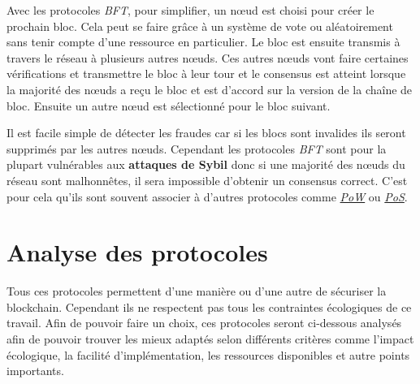 Avec les protocoles \emph{BFT}, pour simplifier, un nœud est choisi pour créer le prochain bloc. Cela peut se faire grâce à un système de vote ou aléatoirement sans tenir compte d'une ressource en particulier. Le bloc est ensuite transmis à travers le réseau à plusieurs autres nœuds. Ces autres nœuds vont faire certaines vérifications et transmettre le bloc à leur tour et le consensus est atteint lorsque la majorité des nœuds a reçu le bloc et est d'accord sur la version de la chaîne de bloc. Ensuite un autre nœud est sélectionné pour le bloc suivant.

Il est facile simple de détecter les fraudes car si les blocs sont invalides ils seront supprimés par les autres nœuds. Cependant les protocoles \emph{BFT} sont pour la plupart vulnérables aux \textbf{attaques de Sybil} donc si une majorité des nœuds du réseau sont malhonnêtes, il sera impossible d'obtenir un consensus correct. C'est pour cela qu'ils sont souvent associer à d'autres protocoles comme \hyperref[consensus:pow]{\emph{PoW}} ou \hyperref[consensus:pos]{\textit{PoS}}.

\section{Analyse des protocoles}

Tous ces protocoles permettent d'une manière ou d'une autre de sécuriser la blockchain. Cependant ils ne respectent pas tous les contraintes écologiques de ce travail. Afin de pouvoir faire un choix, ces protocoles seront ci-dessous analysés afin de pouvoir trouver les mieux adaptés selon différents critères comme l'impact écologique, la facilité d'implémentation, les ressources disponibles et autre points importants.

